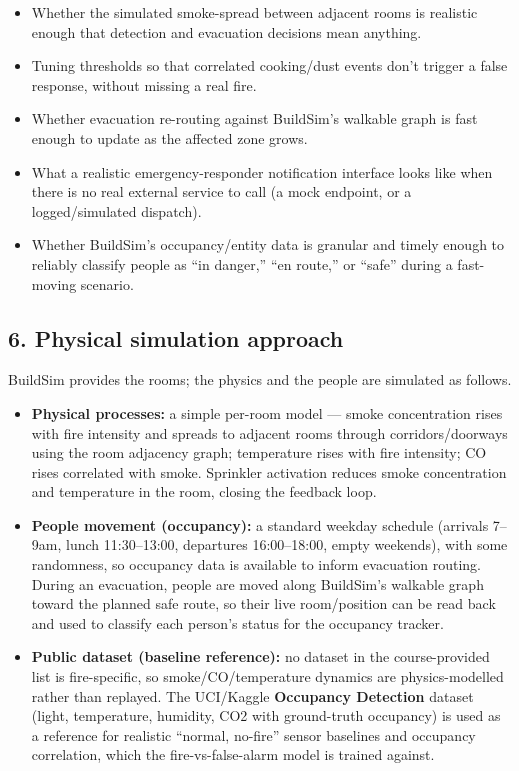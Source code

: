 \documentclass[
  10pt,
]{article}
\providecommand{\tightlist}{%
  \setlength{\itemsep}{0pt}\setlength{\parskip}{0pt}}
\begin{document}
\begin{itemize}
\tightlist
\item
  Whether the simulated smoke-spread between adjacent rooms is realistic
  enough that detection and evacuation decisions mean anything.
\item
  Tuning thresholds so that correlated cooking/dust events don't trigger
  a false response, without missing a real fire.
\item
  Whether evacuation re-routing against BuildSim's walkable graph is
  fast enough to update as the affected zone grows.
\item
  What a realistic emergency-responder notification interface looks like
  when there is no real external service to call (a mock endpoint, or a
  logged/simulated dispatch).
\item
  Whether BuildSim's occupancy/entity data is granular and timely enough
  to reliably classify people as ``in danger,'' ``en route,'' or
  ``safe'' during a fast-moving scenario.
\end{itemize}

\subsection{6. Physical simulation
approach}\label{physical-simulation-approach}

BuildSim provides the rooms; the physics and the people are simulated as
follows.

\begin{itemize}
\tightlist
\item
  \textbf{Physical processes:} a simple per-room model --- smoke
  concentration rises with fire intensity and spreads to adjacent rooms
  through corridors/doorways using the room adjacency graph; temperature
  rises with fire intensity; CO rises correlated with smoke. Sprinkler
  activation reduces smoke concentration and temperature in the room,
  closing the feedback loop.
\item
  \textbf{People movement (occupancy):} a standard weekday schedule
  (arrivals 7--9am, lunch 11:30--13:00, departures 16:00--18:00, empty
  weekends), with some randomness, so occupancy data is available to
  inform evacuation routing. During an evacuation, people are moved
  along BuildSim's walkable graph toward the planned safe route, so
  their live room/position can be read back and used to classify each
  person's status for the occupancy tracker.
\item
  \textbf{Public dataset (baseline reference):} no dataset in the
  course-provided list is fire-specific, so smoke/CO/temperature
  dynamics are physics-modelled rather than replayed. The UCI/Kaggle
  \textbf{Occupancy Detection} dataset (light, temperature, humidity,
  CO2 with ground-truth occupancy) is used as a reference for realistic
  ``normal, no-fire'' sensor baselines and occupancy correlation, which
  the fire-vs-false-alarm model is trained against.
\end{itemize}
\end{document}
